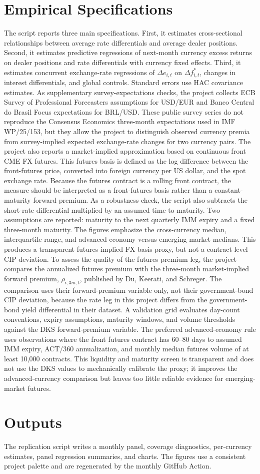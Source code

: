\documentclass[11pt]{article}
\begin{document}
\section{Empirical Specifications}
The script reports three main specifications. First, it estimates cross-sectional relationships between average rate differentials and average dealer positions. Second, it estimates predictive regressions of next-month currency excess returns on dealer positions and rate differentials with currency fixed effects. Third, it estimates concurrent exchange-rate regressions of $\Delta e_{i,t}$ on $\Delta f^*_{i,t}$, changes in interest differentials, and global controls. Standard errors use HAC covariance estimates. As supplementary survey-expectations checks, the project collects ECB Survey of Professional Forecasters assumptions for USD/EUR and Banco Central do Brasil Focus expectations for BRL/USD. These public survey series do not reproduce the Consensus Economics three-month expectations used in IMF WP/25/153, but they allow the project to distinguish observed currency premia from survey-implied expected exchange-rate changes for two currency pairs. The project also reports a market-implied approximation based on continuous front CME FX futures. This futures basis is defined as the log difference between the front-futures price, converted into foreign currency per US dollar, and the spot exchange rate. Because the futures contract is a rolling front contract, the measure should be interpreted as a front-futures basis rather than a constant-maturity forward premium. As a robustness check, the script also subtracts the short-rate differential multiplied by an assumed time to maturity. Two assumptions are reported: maturity to the next quarterly IMM expiry and a fixed three-month maturity. The figures emphasize the cross-currency median, interquartile range, and advanced-economy versus emerging-market medians. This produces a transparent futures-implied FX basis proxy, but not a contract-level CIP deviation. To assess the quality of the futures premium leg, the project compares the annualized futures premium with the three-month market-implied forward premium, $\rho_{i,3m,t}$, published by Du, Keerati, and Schreger. The comparison uses their forward-premium variable only, not their government-bond CIP deviation, because the rate leg in this project differs from the government-bond yield differential in their dataset. A validation grid evaluates day-count conventions, expiry assumptions, maturity windows, and volume thresholds against the DKS forward-premium variable. The preferred advanced-economy rule uses observations where the front futures contract has 60--80 days to assumed IMM expiry, ACT/360 annualization, and monthly median futures volume of at least 10,000 contracts. This liquidity and maturity screen is transparent and does not use the DKS values to mechanically calibrate the proxy; it improves the advanced-currency comparison but leaves too little reliable evidence for emerging-market futures.

\section{Outputs}
The replication script writes a monthly panel, coverage diagnostics, per-currency estimates, panel regression summaries, and charts. The figures use a consistent project palette and are regenerated by the monthly GitHub Action.
\end{document}

